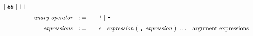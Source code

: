 \begin{alignat*}{9}
                                          |\ \textbf{\texttt{\&\&}}\ |\ \texttt{\textbf{||}}\  \\[1mm]
&& \textit{unary-operator}    
                        && ::= &\quad && \textbf{\texttt{!}}\ |\ \textbf{\texttt{-}}\\[1mm]
&& \textit{expressions}  && ::= &\quad && \epsilon\ | \ \textit{expression}\ (
                                                               \ \textbf{\texttt{,}} \
                                                                 \textit{expression} \ 
                                                                      )\ \ldots
                                                            && \textrm{argument expressions}
\end{alignat*}

\newpage





























\newpage



\newpage



    
